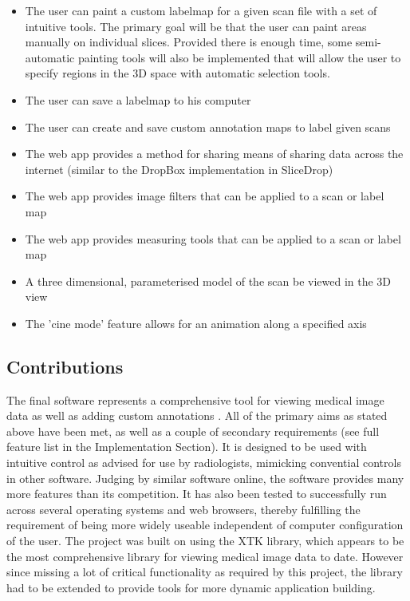 \documentclass[a4paper,11pt,titlepage]{article}
\begin{document}
\begin{itemize}
\item The user can paint a custom labelmap for a given scan file with a set of intuitive tools. The primary goal will be that the user can paint areas manually on individual slices. Provided there is enough time, some semi-automatic painting tools will also be implemented that will allow the user to specify regions in the 3D space with automatic selection tools. 
\item The user can save a labelmap to his computer
\item The user can create and save custom annotation maps to label given scans
\item The web app provides a method for sharing  means of sharing data across the internet (similar to the DropBox implementation in SliceDrop)
\item The web app provides image filters that can be applied to a scan or label map
\item The web app provides measuring tools that can be applied to a scan or label map
\item A three dimensional, parameterised model of the scan be viewed in the 3D view
\item The 'cine mode' feature allows for an animation along a specified axis
\end{itemize}





\subsection{Contributions}

The final software represents a comprehensive tool for viewing medical image data as well as adding custom annotations . All of the primary aims as stated above have been met, as well as a couple of secondary requirements (see full feature list in the Implementation Section). It is designed to be used with intuitive control as advised for use by radiologists, mimicking convential controls in other software. Judging by similar software online, the software provides many more features than its competition. It has also been tested to successfully run across several operating systems and web browsers, thereby fulfilling the requirement of being more widely useable independent of computer configuration of the user. The project was built on using the XTK library, which appears to be the most comprehensive library for viewing medical image data to date. However since missing a lot of critical functionality as required by this project, the library had to be extended to provide tools for more dynamic application building.
\end{document}
